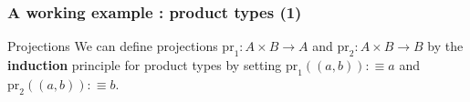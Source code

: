 \documentclass{beamer}
\begin{document}
        \begin{frame}
            \frametitle{A working example : product types (1)}
            \begin{exampleblock}{Projections}
                We can define projections $\mathrm{pr}_1 : A\times B \rightarrow A$ and $\mathrm{pr}_2 : A\times B \rightarrow B$ by the \textbf{induction} principle for product types by setting $\mathrm{pr}_1((a,b)) :\equiv a$ and $\mathrm{pr}_2((a,b)) :\equiv b$.
            \end{exampleblock}
        \end{frame}
        
\end{document}
